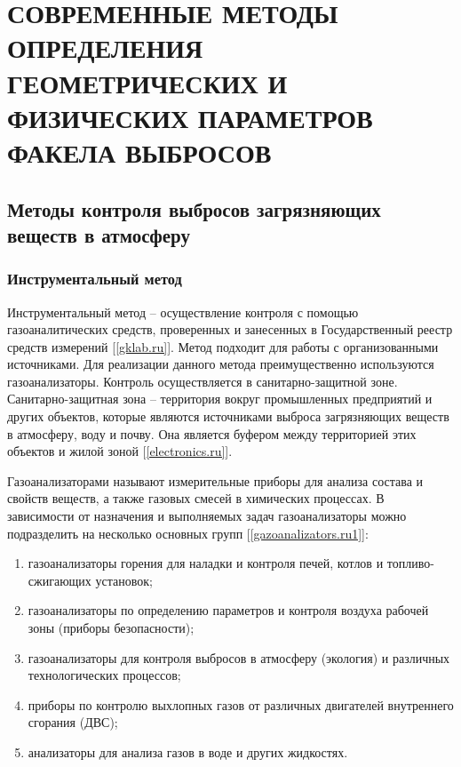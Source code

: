 \documentclass[14pt, a4paper]{extreport}
\begin{document}
\chapter [\vspace*{-0.22cm}СОВРЕМЕННЫЕ МЕТОДЫ ОПРЕДЕЛЕНИЯ ГЕОМЕТРИЧЕСКИХ \hspace*{-0.5cm} И ФИЗИЧЕСКИХ ПАРАМЕТРОВ ФАКЕЛА ВЫБРОСОВ]{\vspace*{-0.22cm}СОВРЕМЕННЫЕ МЕТОДЫ ОПРЕДЕЛЕНИЯ ГЕОМЕТРИЧЕСКИХ И ФИЗИЧЕСКИХ ПАРАМЕТРОВ ФАКЕЛА ВЫБРОСОВ}
\section {Методы контроля выбросов загрязняющих веществ в атмосферу}
\subsection {Инструментальный метод}
	Инструментальный метод -- осуществление контроля с помощью газоаналитических средств, проверенных и занесенных в Государственный реестр средств измерений [\ref{gklab.ru}]. Метод подходит для работы с организованными источниками. Для реализации данного метода преимущественно используются газоанализаторы. Контроль осуществляется в санитарно-защитной зоне. Санитарно-защитная зона -- территория вокруг промышленных предприятий и других объектов, которые являются источниками выброса загрязняющих веществ в атмосферу, воду и почву. Она является буфером между территорией этих объектов и жилой зоной [\ref{electronics.ru}].
	
	Газоанализаторами называют измерительные приборы для анализа состава и свойств веществ, а также газовых смесей в химических процессах. В зависимости от назначения и выполняемых задач газоанализаторы можно подразделить на несколько основных групп [\ref{gazoanalizators.ru1}]:
	\begin{enumerate}[label={\arabic*)}]
		\item газоанализаторы горения для наладки и контроля печей, котлов и топливо-сжигающих установок;
		\item газоанализаторы по определению параметров и контроля воздуха рабочей зоны (приборы безопасности);
		\item газоанализаторы для контроля выбросов в атмосферу (экология) и различных технологических процессов;
		\item приборы по контролю выхлопных газов от различных двигателей внутреннего сгорания (ДВС);
		\item анализаторы для анализа газов в воде и других жидкостях.
	\end{enumerate}	
		
\end{document}
